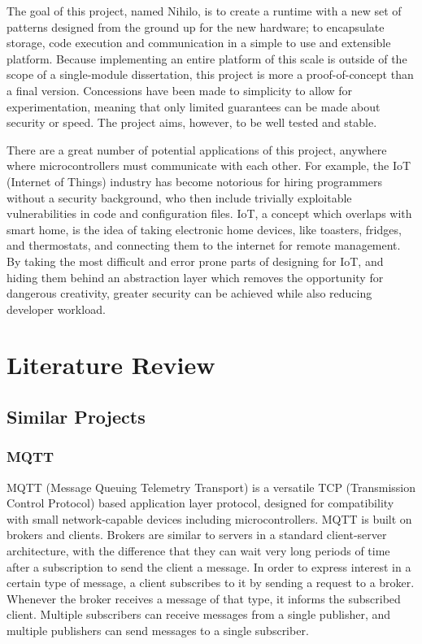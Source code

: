 \documentclass{article}
\begin{document}
The goal of this project, named Nihilo, is to create a runtime with a new set of patterns designed from the ground up for the new hardware; to encapsulate storage, code execution and communication in a simple to use and extensible platform.
Because implementing an entire platform of this scale is outside of the scope of a single-module dissertation, this project is more a proof-of-concept than a final version.
Concessions have been made to simplicity to allow for experimentation, meaning that only limited guarantees can be made about security or speed.
The project aims, however, to be well tested and stable.

There are a great number of potential applications of this project, anywhere where microcontrollers must communicate with each other. For example, the IoT (Internet of Things) industry has become notorious for hiring programmers without a security background, who then include trivially exploitable vulnerabilities in code and configuration files\cite{internetofsh}. IoT, a concept which overlaps with smart home, is the idea of taking electronic home devices, like toasters, fridges, and thermostats, and connecting them to the internet for remote management. By taking the most difficult and error prone parts of designing for IoT, and hiding them behind an abstraction layer which removes the opportunity for dangerous creativity, greater security can be achieved while also reducing developer workload.

\section{Literature Review}
\subsection{Similar Projects}
\subsubsection{MQTT}
MQTT (Message Queuing Telemetry Transport) is a versatile TCP (Transmission Control Protocol) based application layer protocol\cite{MQTT}, designed for compatibility with small network-capable devices including microcontrollers. MQTT is built on brokers and clients. Brokers are similar to servers in a standard client-server architecture, with the difference that they can wait very long periods of time after a subscription to send the client a message. In order to express interest in a certain type of message, a client subscribes to it by sending a request to a broker. Whenever the broker receives a message of that type, it informs the subscribed client. Multiple subscribers can receive messages from a single publisher, and multiple publishers can send messages to a single subscriber.
\end{document}

